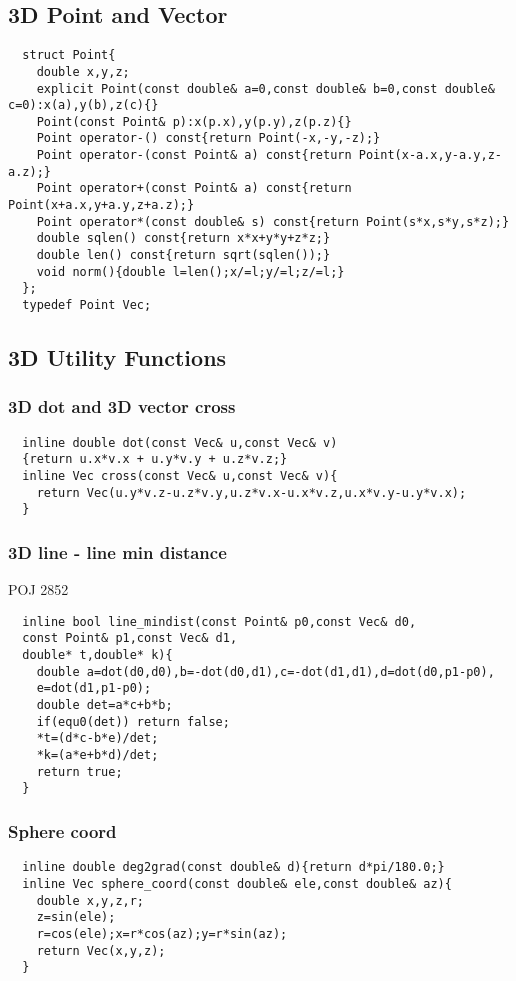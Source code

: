 \documentclass[a4paper]{article}
\begin{document}
\subsection{3D Point and Vector}
\begin{lstlisting}
  struct Point{
    double x,y,z;
    explicit Point(const double& a=0,const double& b=0,const double& c=0):x(a),y(b),z(c){}
    Point(const Point& p):x(p.x),y(p.y),z(p.z){}
    Point operator-() const{return Point(-x,-y,-z);}
    Point operator-(const Point& a) const{return Point(x-a.x,y-a.y,z-a.z);}
    Point operator+(const Point& a) const{return Point(x+a.x,y+a.y,z+a.z);}
    Point operator*(const double& s) const{return Point(s*x,s*y,s*z);}
    double sqlen() const{return x*x+y*y+z*z;}
    double len() const{return sqrt(sqlen());}
    void norm(){double l=len();x/=l;y/=l;z/=l;}
  };
  typedef Point Vec;
\end{lstlisting}
\subsection{3D Utility Functions}
\subsubsection{3D dot and 3D vector cross}
\begin{lstlisting}
  inline double dot(const Vec& u,const Vec& v) 
  {return u.x*v.x + u.y*v.y + u.z*v.z;}
  inline Vec cross(const Vec& u,const Vec& v){
    return Vec(u.y*v.z-u.z*v.y,u.z*v.x-u.x*v.z,u.x*v.y-u.y*v.x);
  }
\end{lstlisting}
\subsubsection{3D line - line min distance}
POJ 2852
\begin{lstlisting}
  inline bool line_mindist(const Point& p0,const Vec& d0,
  const Point& p1,const Vec& d1,
  double* t,double* k){
    double a=dot(d0,d0),b=-dot(d0,d1),c=-dot(d1,d1),d=dot(d0,p1-p0),
    e=dot(d1,p1-p0);
    double det=a*c+b*b;
    if(equ0(det)) return false;
    *t=(d*c-b*e)/det;
    *k=(a*e+b*d)/det;
    return true;
  }
\end{lstlisting}
\subsubsection{Sphere coord}
\begin{lstlisting}
  inline double deg2grad(const double& d){return d*pi/180.0;}
  inline Vec sphere_coord(const double& ele,const double& az){
    double x,y,z,r;
    z=sin(ele);
    r=cos(ele);x=r*cos(az);y=r*sin(az);
    return Vec(x,y,z);
  }
\end{lstlisting}
\end{document}
